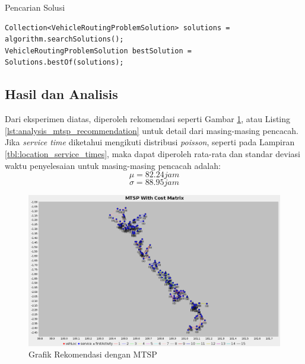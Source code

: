 \begin{listing}
	\caption{Pencarian Solusi}
	\label{lst:jsprit_search_solution}
	\begin{verbatim}
Collection<VehicleRoutingProblemSolution> solutions = algorithm.searchSolutions();
VehicleRoutingProblemSolution bestSolution = Solutions.bestOf(solutions);
	\end{verbatim}
\end{listing}


\subsection{Hasil dan Analisis}
Dari eksperimen diatas, diperoleh rekomendasi seperti Gambar \ref{fig:analysis_mtsp_recommendation}, atau Listing \ref{lst:analysis_mtsp_recommendation} untuk detail dari masing-masing pencacah. Jika \textit{service time} diketahui mengikuti distribusi \textit{poisson}, seperti pada Lampiran \ref{tbl:location_service_times}, maka dapat diperoleh rata-rata dan standar deviasi waktu penyelesaian untuk masing-masing pencacah adalah:
$$ \mu = 82.24 jam $$
$$ \sigma = 88.95 jam $$


\begin{figure}[h]
	\centering
	\includegraphics[width=\textwidth]{../../Resources/Images/analysis_mtsp_no_time_windows}
	\caption{Grafik Rekomendasi dengan MTSP}
	\label{fig:analysis_mtsp_recommendation}
\end{figure}


